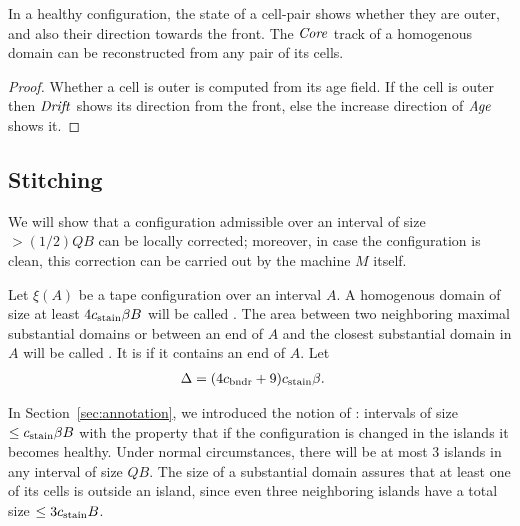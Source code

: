 \documentclass[11pt]{memoir}
\theoremstyle{definition} %
\renewcommand{\le}{\leq}
\newcommand{\fld}[1]{\ensuremath{\textit{#1\/}}}
\def\B{B}
\newcommand{\Q}{Q} %
\newcommand{\Age}{\fld{Age}} %
\newcommand{\Core}{\fld{Core}}
\newcommand{\Drift}{\fld{Drift}}
\newcommand{\cns}[1]{c_{\textrm{\upshape #1}}}
\newcommand{\CBoundaries}{\cns{bndr}}
\newcommand{\CStain}{\cns{stain}}
\begin{document}
\begin{lemma}\label{lem:infer-between}
In a healthy configuration, 
the state of a cell-pair shows whether they are outer, and also their direction towards the front.
The \( \Core \) track of a homogenous domain can be reconstructed from any pair of its cells.
\end{lemma}
\begin{proof}
Whether a cell is outer is computed from its age field.
If the cell is outer then \( \Drift \) shows its direction from the front,
else the increase direction of \( \Age \) shows it.
\end{proof}



\subsection{Stitching}\label{sec:stitching}

We will show that a configuration admissible over an interval of size \( >(1/2)\Q\B \)
can be locally corrected;
moreover, in case the configuration is clean, this correction
can be carried out by the machine \( M \) itself.

\begin{definition}\label{def:substantial}
Let \( \xi(A) \) be a tape configuration over an interval \( A \).
A homogenous domain of size at least \( 4\CStain\beta\B \) will be called .
The area between two neighboring maximal
substantial domains or between an end of \( A \) and the closest substantial domain in \( A \)
will be called .
It is  if it contains an end of \( A \).
Let
 \begin{align}\label{eq:Delta}
     \Delta &= (4 \CBoundaries+9)\CStain\beta.
 \end{align}
\end{definition}

In Section~\ref{sec:annotation}, we introduced the notion of : intervals
of size \( \le\CStain\beta\B \) with the property that if the configuration is changed in the
islands it becomes healthy.
Under normal circumstances, there will be at most 3 islands in any interval of size \( \Q\B \).
The size of a substantial domain assures that at least one of its cells is
outside an island, since even three neighboring islands have a
total size \( \le 3\CStain\B \).
\end{document}
